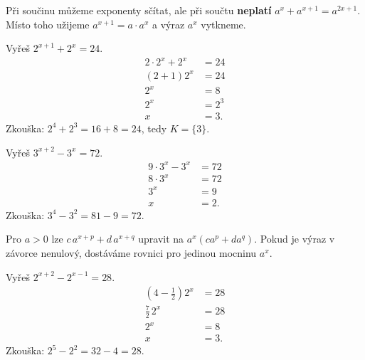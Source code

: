 \documentclass[11pt,a4paper]{article}
\begin{document}
Při součinu můžeme exponenty sčítat, ale při součtu \textbf{neplatí} $a^x+a^{x+1}=a^{2x+1}$. Místo toho užijeme $a^{x+1}=a\cdot a^x$ a výraz $a^x$ vytkneme.\par
\begin{prikladReseniBox}[title={Příklad 1}]
Vyřeš $2^{x+1}+2^x=24$.
\tcblower
\[\begin{aligned}2\cdot2^x+2^x&=24\\(2+1)2^x&=24\\2^x&=8\\2^x&=2^3\\x&=3.\end{aligned}\]
Zkouška: $2^4+2^3=16+8=24$, tedy $K=\{3\}$.
\end{prikladReseniBox}
\begin{prikladReseniBox}[title={Příklad 2}]
Vyřeš $3^{x+2}-3^x=72$.
\tcblower
\[\begin{aligned}9\cdot3^x-3^x&=72\\8\cdot3^x&=72\\3^x&=9\\x&=2.\end{aligned}\]
Zkouška: $3^4-3^2=81-9=72$.
\end{prikladReseniBox}
\begin{zadaniBox}[title={Věta - Vytknutí společné exponenciální mocniny}]
Pro $a>0$ lze $c\,a^{x+p}+d\,a^{x+q}$ upravit na $a^x(ca^p+da^q)$. Pokud je výraz v závorce nenulový, dostáváme rovnici pro jedinou mocninu $a^x$.
\end{zadaniBox}
\begin{prikladReseniBox}[title={Příklad 3}]
Vyřeš $2^{x+2}-2^{x-1}=28$.
\tcblower
\[\begin{aligned}(4-\frac{1}{2})2^x&=28\\\frac{7}{2}\,2^x&=28\\2^x&=8\\x&=3.\end{aligned}\]
Zkouška: $2^5-2^2=32-4=28$.
\end{prikladReseniBox}
\end{document}

